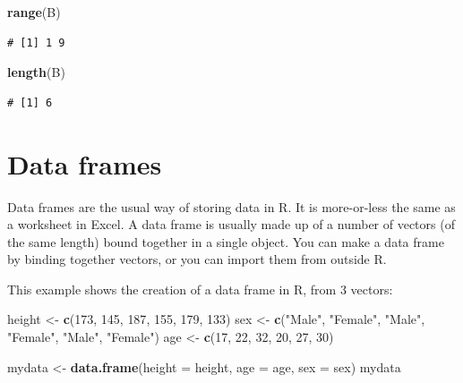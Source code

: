 \documentclass[
  a4paperpaper,
]{book}
\newenvironment{Shaded}{\begin{snugshade}}{\end{snugshade}}
\newcommand{\DataTypeTok}[1]{\textcolor[rgb]{0.13,0.29,0.53}{#1}}
\newcommand{\DecValTok}[1]{\textcolor[rgb]{0.00,0.00,0.81}{#1}}
\newcommand{\KeywordTok}[1]{\textcolor[rgb]{0.13,0.29,0.53}{\textbf{#1}}}
\newcommand{\NormalTok}[1]{#1}
\newcommand{\StringTok}[1]{\textcolor[rgb]{0.31,0.60,0.02}{#1}}
\begin{document}
\begin{Shaded}
\begin{Highlighting}[]
\KeywordTok{range}\NormalTok{(B)}
\end{Highlighting}
\end{Shaded}

\begin{verbatim}
# [1] 1 9
\end{verbatim}

\begin{Shaded}
\begin{Highlighting}[]
\KeywordTok{length}\NormalTok{(B)}
\end{Highlighting}
\end{Shaded}

\begin{verbatim}
# [1] 6
\end{verbatim}

\hypertarget{data-frames}{%
\section{Data frames}\label{data-frames}}

Data frames are the usual way of storing data in R. It is more-or-less the same as a worksheet in Excel. A data frame is usually made up of a number of vectors (of the same length) bound together in a single object. You can make a data frame by binding together vectors, or you can import them from outside R.

This example shows the creation of a data frame in R, from 3 vectors:

\begin{Shaded}
\begin{Highlighting}[]
\NormalTok{height \textless{}{-}}\StringTok{ }\KeywordTok{c}\NormalTok{(}\DecValTok{173}\NormalTok{, }\DecValTok{145}\NormalTok{, }\DecValTok{187}\NormalTok{, }\DecValTok{155}\NormalTok{, }\DecValTok{179}\NormalTok{, }\DecValTok{133}\NormalTok{)}
\NormalTok{sex \textless{}{-}}\StringTok{ }\KeywordTok{c}\NormalTok{(}\StringTok{"Male"}\NormalTok{, }\StringTok{"Female"}\NormalTok{, }\StringTok{"Male"}\NormalTok{, }\StringTok{"Female"}\NormalTok{, }\StringTok{"Male"}\NormalTok{, }\StringTok{"Female"}\NormalTok{)}
\NormalTok{age \textless{}{-}}\StringTok{ }\KeywordTok{c}\NormalTok{(}\DecValTok{17}\NormalTok{, }\DecValTok{22}\NormalTok{, }\DecValTok{32}\NormalTok{, }\DecValTok{20}\NormalTok{, }\DecValTok{27}\NormalTok{, }\DecValTok{30}\NormalTok{)}

\NormalTok{mydata \textless{}{-}}\StringTok{ }\KeywordTok{data.frame}\NormalTok{(}\DataTypeTok{height =}\NormalTok{ height, }\DataTypeTok{age =}\NormalTok{ age, }\DataTypeTok{sex =}\NormalTok{ sex)}
\NormalTok{mydata}
\end{Highlighting}
\end{Shaded}
\end{document}
